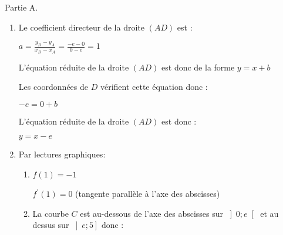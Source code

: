 \begin{corrige}
     \begin{h3}Partie A.\end{h3}
     \begin{enumerate}
          \item
          Le coefficient directeur de la droite $\left(AD\right)$ est :
          \par
          $a=\frac{y_{D}-y_{A}}{x_{D}-x_{A}}=\frac{-e-0}{0-e}=1$
          \par
          L'équation réduite de la droite $\left(AD\right)$ est donc de la forme $y=x+b$
          \par
          Les coordonnées de $D$ vérifient cette équation donc :
          \par
          $-e=0+b$
          \par
          L'équation réduite de la droite $\left(AD\right)$ est donc :
          \par
          $y=x-e$
          \item
          Par lectures graphiques:
          \begin{enumerate}
               \item
               $f\left(1\right)=-1$
               \par
               $f^{\prime}\left(1\right)=0$ (tangente parallèle à l'axe des abscisses)
               \item
               La courbe $C$ est au-dessous de l'axe des abscisses sur $\left]0; e\right[$ et au dessus sur $\left]e; 5\right]$ donc :
\begin{center}
 \begin{extern}%
\end{extern}
\end{center}
\end{enumerate}
\end{enumerate}
\end{corrige}
